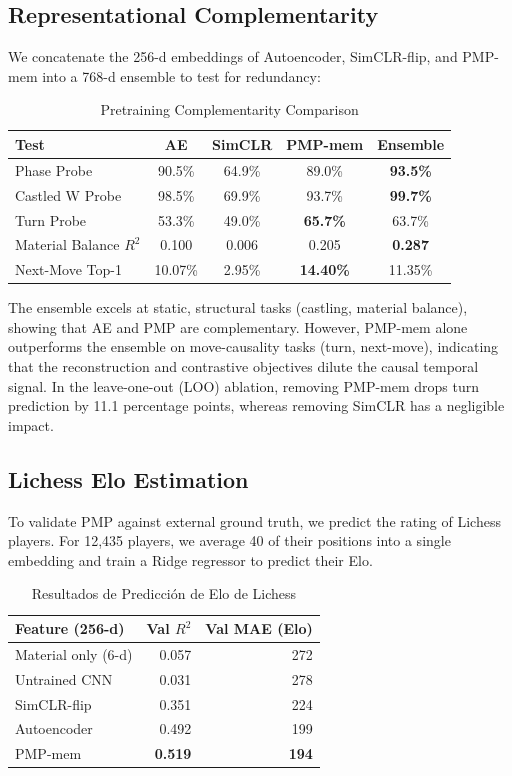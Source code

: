\documentclass[journal]{IEEEtran}
\begin{document}
\subsection{Representational Complementarity}
We concatenate the 256-d embeddings of Autoencoder, SimCLR-flip, and PMP-mem into a 768-d ensemble to test for redundancy:

\begin{table}[h]
\caption{Pretraining Complementarity Comparison}
\label{tab:complementarity}
\centering
\begin{tabular}{lcccc}
\toprule
Test & AE & SimCLR & PMP-mem & Ensemble \\
\midrule
Phase Probe & 90.5\% & 64.9\% & 89.0\% & \textbf{93.5\%} \\
Castled W Probe & 98.5\% & 69.9\% & 93.7\% & \textbf{99.7\%} \\
Turn Probe & 53.3\% & 49.0\% & \textbf{65.7\%} & 63.7\% \\
Material Balance $R^2$ & 0.100 & 0.006 & 0.205 & \textbf{0.287} \\
Next-Move Top-1 & 10.07\% & 2.95\% & \textbf{14.40\%} & 11.35\% \\
\bottomrule
\end{tabular}
\end{table}

The ensemble excels at static, structural tasks (castling, material balance), showing that AE and PMP are complementary. However, PMP-mem alone outperforms the ensemble on move-causality tasks (turn, next-move), indicating that the reconstruction and contrastive objectives dilute the causal temporal signal. In the leave-one-out (LOO) ablation, removing PMP-mem drops turn prediction by 11.1 percentage points, whereas removing SimCLR has a negligible impact.

\subsection{Lichess Elo Estimation}
To validate PMP against external ground truth, we predict the rating of Lichess players. For 12,435 players, we average 40 of their positions into a single embedding and train a Ridge regressor to predict their Elo.

\begin{table}[h]
\caption{Resultados de Predicci\'on de Elo de Lichess}
\label{tab:elo}
\centering
\begin{tabular}{lrr}
\toprule
Feature (256-d) & Val $R^2$ & Val MAE (Elo) \\
\midrule
Material only (6-d) & 0.057 & 272 \\
Untrained CNN & 0.031 & 278 \\
SimCLR-flip & 0.351 & 224 \\
Autoencoder & 0.492 & 199 \\
PMP-mem & \textbf{0.519} & \textbf{194} \\
\bottomrule
\end{tabular}
\end{table}
\end{document}
